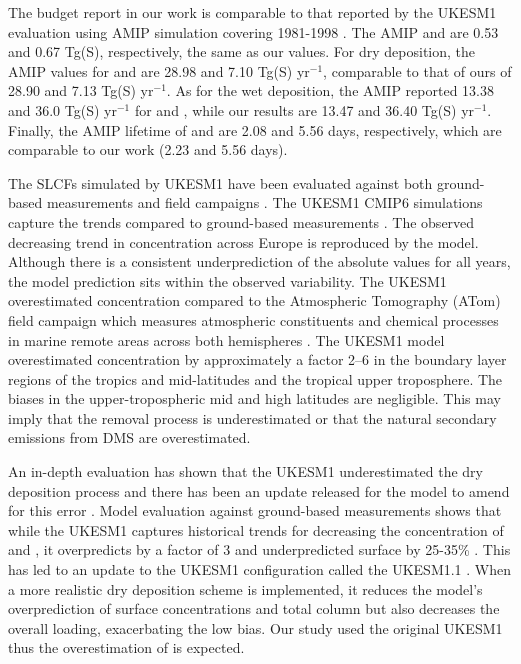 The budget report in our work is comparable to that reported by the UKESM1 evaluation using AMIP simulation covering 1981-1998 \citep{mulcahyDescriptionEvaluationAerosol2020}. The AMIP  and  are 0.53 and 0.67 Tg(S), respectively, the same as our values. For dry deposition, the AMIP values for  and  are 28.98 and 7.10 Tg(S) yr$^{-1}$, comparable to that of ours of 28.90 and 7.13 Tg(S) yr$^{-1}$. As for the wet deposition, the AMIP reported 13.38 and 36.0 Tg(S) yr$^{-1}$ for  and , while our results are 13.47 and 36.40 Tg(S) yr$^{-1}$. Finally, the AMIP lifetime of  and  are 2.08 and 5.56 days, respectively, which are comparable to our work (2.23 and 5.56 days).  

The SLCFs simulated by UKESM1 have been evaluated against both ground-based measurements and field campaigns \citep[e.g.][]{griffithsTroposphericOzoneCMIP62021, russoSeasonalInterannualDecadal2023}. The UKESM1 CMIP6 simulations capture the  trends compared to ground-based measurements \citep{mulcahyDescriptionEvaluationAerosol2020}. The observed decreasing trend in  concentration across Europe is reproduced by the model. Although there is a consistent underprediction of the absolute values for all years, the model prediction sits within the observed variability. The UKESM1 overestimated  concentration compared to the Atmospheric Tomography (ATom) field campaign which measures atmospheric constituents and chemical processes in marine remote areas across both hemispheres \citep{ranjithkumarConstraintsGlobalAerosol2021}. The UKESM1 model overestimated  concentration by approximately a factor 2–6 in the boundary layer regions of the tropics and mid-latitudes and the tropical upper troposphere. The biases in the upper-tropospheric mid and high latitudes are negligible. This may imply that the  removal process is underestimated or that the natural secondary emissions from DMS are overestimated.  

An in-depth evaluation has shown that the UKESM1 underestimated the dry deposition process and there has been an update released for the model to amend for this error \citep{hardacreEvaluationSO2SO422021}. Model evaluation against ground-based measurements shows that while the UKESM1 captures historical trends for decreasing the concentration of  and , it overpredicts  by a factor of 3 and underpredicted surface  by 25-35\% \citep{hardacreEvaluationSO2SO422021}. This has led to an update to the UKESM1 configuration called the UKESM1.1 \citep{mulcahyUKESM1DevelopmentEvaluation2022}. When a more realistic dry deposition scheme is implemented, it reduces the model’s overprediction of surface  concentrations and total column  but also decreases the overall  loading, exacerbating the low bias.  Our study used the original UKESM1 thus the overestimation of  is expected.


